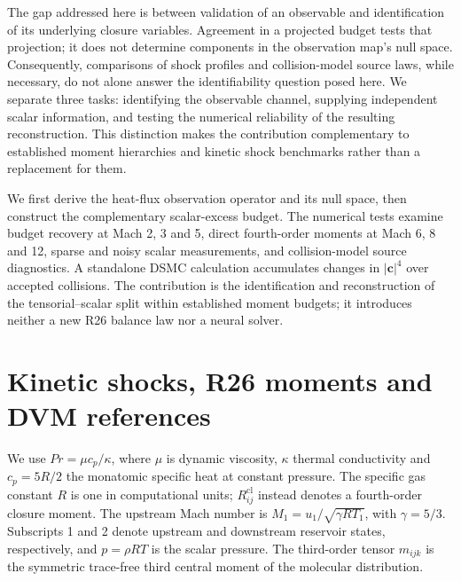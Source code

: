 \documentclass[lineno,paper]{JFM-FLM_Au}
\newenvironment{revision}{\nolinenumbers\begin{tcolorbox}[breakable,colback=revisionyellow,colframe=revisionyellow,boxrule=0pt,arc=0pt,left=5pt,right=5pt,top=5pt,bottom=5pt,before skip=6pt,after skip=6pt]\captionsetup{width=\linewidth}}{\end{tcolorbox}\linenumbers}
\newenvironment{revision}{}{}
\newcommand{\cl}{\mathrm{cl}}
\begin{document}
\begin{revision}
The gap addressed here is between validation of an observable and identification of its underlying closure variables. Agreement in a projected budget tests that projection; it does not determine components in the observation map's null space. Consequently, comparisons of shock profiles and collision-model source laws, while necessary, do not alone answer the identifiability question posed here. We separate three tasks: identifying the observable channel, supplying independent scalar information, and testing the numerical reliability of the resulting reconstruction. This distinction makes the contribution complementary to established moment hierarchies and kinetic shock benchmarks rather than a replacement for them.
\end{revision}

\begin{revision}
We first derive the heat-flux observation operator and its null space, then construct the complementary scalar-excess budget. The numerical tests examine budget recovery at Mach 2, 3 and 5, direct fourth-order moments at Mach 6, 8 and 12, sparse and noisy scalar measurements, and collision-model source diagnostics. A standalone DSMC calculation accumulates changes in $|\boldsymbol c|^4$ over accepted collisions. The contribution is the identification and reconstruction of the tensorial--scalar split within established moment budgets; it introduces neither a new R26 balance law nor a neural solver.
\end{revision}

\section{Kinetic shocks, R26 moments and DVM references}
\label{sec:reference}
\begin{revision}
We use $Pr=\mu c_p/\kappa$, where $\mu$ is dynamic viscosity,
$\kappa$ thermal conductivity and $c_p=5R/2$ the monatomic specific
heat at constant pressure. The specific gas constant $R$ is one in
computational units; $R^{\cl}_{ij}$ instead denotes a fourth-order
closure moment. The upstream Mach number is
$M_1=u_1/\sqrt{\gamma RT_1}$, with $\gamma=5/3$.
Subscripts 1 and 2 denote upstream and downstream reservoir states,
respectively, and $p=\rho RT$ is the scalar pressure.
The third-order tensor $m_{ijk}$ is the symmetric trace-free third
central moment of the molecular distribution.
\end{revision}
\end{document}
